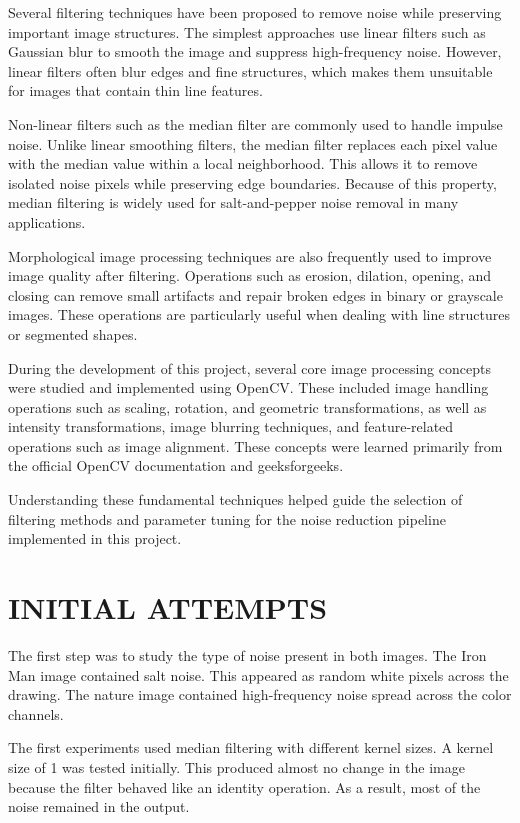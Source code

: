 \documentclass[letterpaper, 10 pt, conference]{ieeeconf}
\begin{document}
Several filtering techniques have been proposed to remove noise while preserving important image structures. 
The simplest approaches use linear filters such as Gaussian blur to smooth the image and suppress high-frequency noise. 
However, linear filters often blur edges and fine structures, which makes them unsuitable for images that contain thin line features.

Non-linear filters such as the median filter are commonly used to handle impulse noise. 
Unlike linear smoothing filters, the median filter replaces each pixel value with the median value within a local neighborhood. 
This allows it to remove isolated noise pixels while preserving edge boundaries. 
Because of this property, median filtering is widely used for salt-and-pepper noise removal in many applications.

Morphological image processing techniques are also frequently used to improve image quality after filtering. 
Operations such as erosion, dilation, opening, and closing can remove small artifacts and repair broken edges in binary or grayscale images. 
These operations are particularly useful when dealing with line structures or segmented shapes.

During the development of this project, several core image processing concepts were studied and implemented using OpenCV. 
These included image handling operations such as scaling, rotation, and geometric transformations, as well as intensity transformations, image blurring techniques, and feature-related operations such as image alignment. 
These concepts were learned primarily from the official OpenCV documentation and geeksforgeeks.

Understanding these fundamental techniques helped guide the selection of filtering methods and parameter tuning for the noise reduction pipeline implemented in this project.


\section{INITIAL ATTEMPTS}

The first step was to study the type of noise present in both images. The Iron Man image contained salt noise. This appeared as random white pixels across the drawing. 
The nature image contained high-frequency noise spread across the color channels.

The first experiments used median filtering with different kernel sizes. A kernel size of 1 was tested initially. 
This produced almost no change in the image because the filter behaved like an identity operation. 
As a result, most of the noise remained in the output.
\end{document}
